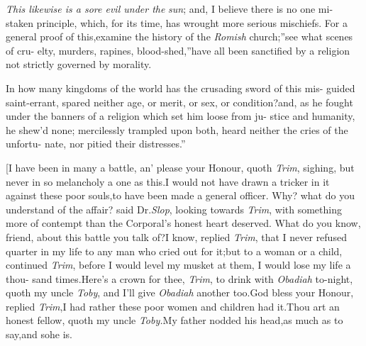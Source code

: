 \documentclass{article}
\begin{document}
\lqq \textit{This likewise is a sore evil under the}\break
\lqq \textit{sun}; and, I believe there is no one mi-\break
\lqq staken principle, which, for its time,\break
\lqq has wrought more serious mischiefs.\tsh\break
\lqq For a general proof of this,\tsk examine\break
\lqq the history of the \textit{Romish} church;”\tsk{}\tsk \lqq see what scenes of cru-\break
\lqq elty, murders, rapines, blood-shed,” \lqq have all been sanctified\break
\lqq by a religion not strictly governed by\break
\lqq morality.\\
\newpage


\lqq In how many kingdoms of the world\break
\lqq has the crusading sword of this mis-\break
\lqq guided saint-errant, spared neither age,\break
\lqq or merit, or sex, or condition?\tsk and,\break
\lqq as he fought under the banners of a\break
\lqq religion which set him loose from ju-\break
\lqq stice and humanity, he shew’d none;\break
\lqq mercilessly trampled upon both,\tsh\break
\lqq heard neither the cries of the unfortu-\break
\lqq nate, nor pitied their distresses.”

[I have been in many a battle, an’ please your Honour, quoth \textit{Trim},
sighing, but never in so melancholy a one as this.\tsk I would not have drawn
a tricker
in it against these poor souls,\tsh to have been made a general
officer.\tsh\break 
Why? what do you understand of the affair?
said Dr.\@ \textit{Slop}, looking towards \textit{Trim}, with
something more of contempt than the Corporal’s honest heart
deserved.\tsh\break 
What do you know, friend, about this battle
you talk of?\tsh I know, replied \textit{Trim}, that I never
refused quarter in my life to any man who cried out for
it;\tsh\break but to a woman or a child, continued
\textit{Trim}, before I would level my musket\break
at them, I would lose my life a thou-\break
sand times.\tsk Here’s a crown for thee,\break
\textit{Trim}, to drink with \textit{Obadiah} to-night,\break
quoth my
uncle \textit{Toby}, and I’ll give \textit{Obadiah} another
too.\tsk God bless your Honour, replied \textit{Trim},\tsh I had
rather these poor women and children had it.\tsh\break Thou art
an honest fellow, quoth my\break
uncle \textit{Toby.}\tsh My father
nodded his 
head,\tsh as much as to say,\tsh and so\break he is.\tsh
\end{document}
